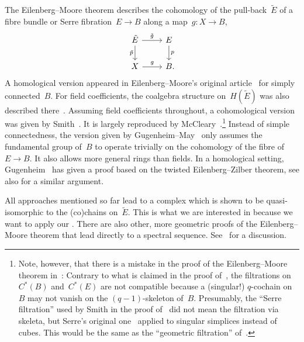 \documentclass[letterpaper]{amsart}
\numberwithin{equation}{section}
\theoremstyle{plain}
\theoremstyle{definition}
\theoremstyle{remark}
\def\gE{\tilde{E}}
\def\gp{\tilde{p}}
\begin{document}
The Eilenberg--Moore theorem describes the cohomology of the pull-back~$\gE$ of a fibre bundle
or Serre fibration~$E\to B$ along a map~$g\colon X\to B$,
\begin{equation}
  \label{eq:pull-back}
  \begin{tikzcd}
    \gE \arrow{d}[left]{\gp} \arrow{r}{\tilde{g}} & E \arrow{d}{p} \\
    X \arrow{r}{g} & B \mathrlap{.}
  \end{tikzcd}
\end{equation}
A homological version appeared in Eilenberg--Moore's original article~\cite[Thm.~12.1]{EilenbergMoore:1966}
for simply connected~$B$. For field coefficients, the coalgebra structure on~$H(\gE)$ was also
described there~\cite[Sec.~18]{EilenbergMoore:1966}.
Assuming field coefficients throughout, a cohomological version was given by Smith~\cite[Sec.~I.3]{Smith:1967}.
It is largely reproduced by McCleary~\cite[Sec.~7.1~\&~7.2]{McCleary:2001}.\footnote{%
  Note, however, that there is a mistake in the proof of the Eilenberg--Moore theorem in~\cite{McCleary:2001}: %
  Contrary to what is claimed in the proof of~\cite[Thm.~7.14]{McCleary:2001},
  the filtrations on~$C^{*}(B)$ and~$C^{*}(E)$ are not compatible because a (singular!) $q$-cochain on~$B$
  may not vanish on the $(q-1)$-skeleton of~$B$. Presumably, the ``Serre filtration'' used by Smith
  in the proof of~\cite[Prop.~I.3.2]{Smith:1967} did not mean the filtration via skeleta,
  but Serre's original one~\cite[Sec.~II.4]{Serre:1951} applied to singular simplices instead of cubes.
  This would be the same as the ``geometric filtration'' of~\cite[Sec.~11]{EilenbergMoore:1966}.}
Instead of simple connectedness, the version given by Gugenheim--May~\cite[Thm.~3.3, Cor.~3.5]{GugenheimMay:1974}
only assumes the fundamental group of~$B$ to operate trivially on the cohomology of the fibre of~$E\to B$.
It also allows more general rings than fields.
In a homological setting, Gugenheim~\cite[Sec.~6.3]{Gugenheim:1972} has given a proof based on the twisted Eilenberg--Zilber theorem,
see also \cite[Prop.~8.3]{Franz:homog} for a similar argument.

All approaches mentioned so far lead to a complex which is shown to be quasi-isomorphic to the (co)chains
on~$\gE$. This is what we are interested in because we want to apply our .
There are also other, more geometric proofs of the Eilenberg--Moore theorem that lead directly to a spectral sequence.
See~\cite[Sec.~8.3]{McCleary:2001} for a discussion.
\end{document}
